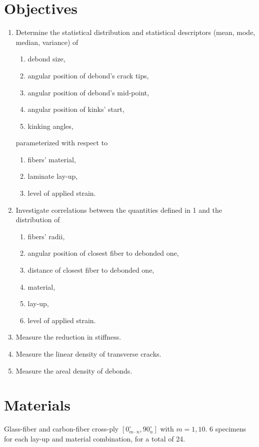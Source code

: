 \documentclass[review]{elsarticle}
\begin{document}
\section{Objectives}
\begin{enumerate}
\item Determine the statistical distribution and statistical descriptors (mean, mode, median, variance) of
\begin{enumerate}[label=\alph*]
\item debond size,
\item angular position of debond's crack tips,
\item angular position of debond's mid-point,
\item angular position of kinks' start,
\item kinking angles,
\end{enumerate}
parameterized with respect to
\begin{enumerate}[label=\alph*]
\item fibers' material,
\item laminate lay-up,
\item level of applied strain.
\end{enumerate}

\item Investigate correlations between the quantities defined in 1 and the distribution of
\begin{enumerate}[label=\alph*]
\item fibers' radii,
\item angular position of closest fiber to debonded one,
\item distance of closest fiber to debonded one,
\item material,
\item lay-up,
\item level of applied strain.
\end{enumerate}

\item Measure the reduction in stiffness.
\item Measure the linear density of transverse cracks.
\item Measure the areal density of debonds.

\end{enumerate}

\section{Materials}
Glass-fiber and carbon-fiber cross-ply $[0_{m\cdot n}^{\circ},90_{n}^{\circ}]$ with $m=1,10$. 6 specimens for each lay-up and material combination, for a total of 24.
\end{document}
